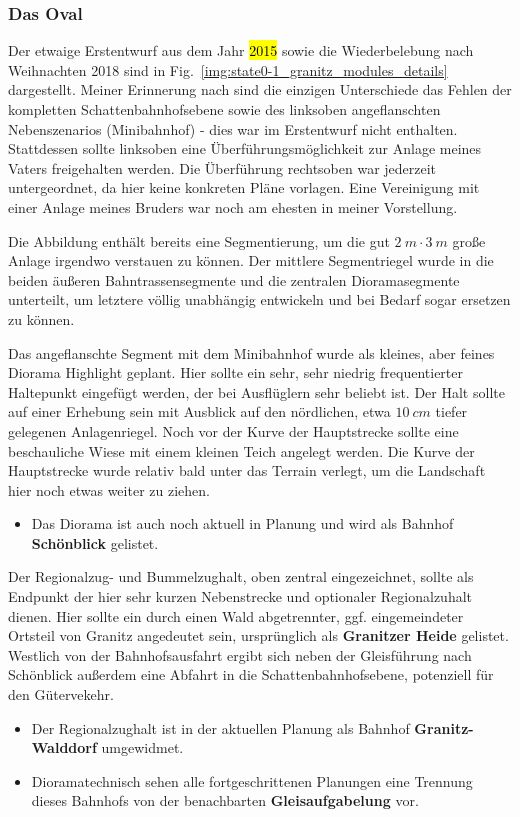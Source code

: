 \subsubsection{Das Oval}
\label{sec:map_development_state1}

Der etwaige Erstentwurf aus dem Jahr \hl{2015} sowie die Wiederbelebung nach Weihnachten 2018 sind in Fig.~\ref{img:state0-1_granitz_modules_details} dargestellt.
Meiner Erinnerung nach sind die einzigen Unterschiede das Fehlen der kompletten Schattenbahnhofsebene sowie des linksoben angeflanschten Nebenszenarios (Minibahnhof) - dies war im Erstentwurf nicht enthalten.
Stattdessen sollte linksoben eine \"Uberf\"uhrungsm\"oglichkeit zur Anlage meines Vaters freigehalten werden.
Die \"Uberf\"uhrung rechtsoben war jederzeit untergeordnet, da hier keine konkreten Pl\"ane vorlagen.
Eine Vereinigung mit einer Anlage meines Bruders war noch am ehesten in meiner Vorstellung.

Die Abbildung enth\"alt bereits eine Segmentierung, um die gut $2~m \cdot 3~m$ gro{\ss}e Anlage irgendwo verstauen zu k\"onnen.
Der mittlere Segmentriegel wurde in die beiden \"au{\ss}eren Bahntrassensegmente und die zentralen Dioramasegmente unterteilt, um letztere v\"ollig unabh\"angig entwickeln und bei Bedarf sogar ersetzen zu k\"onnen.

Das angeflanschte Segment mit dem Minibahnhof wurde als kleines, aber feines Diorama Highlight geplant.
Hier sollte ein sehr, sehr niedrig frequentierter Haltepunkt eingef\"ugt werden, der bei Ausfl\"uglern sehr beliebt ist.
Der Halt sollte auf einer Erhebung sein mit Ausblick auf den n\"ordlichen, etwa $10~cm$ tiefer gelegenen Anlagenriegel.
Noch vor der Kurve der Hauptstrecke sollte eine beschauliche Wiese mit einem kleinen Teich angelegt werden.
Die Kurve der Hauptstrecke wurde relativ bald unter das Terrain verlegt, um die Landschaft hier noch etwas weiter zu ziehen.
\begin{itemize}
	\item Das Diorama ist auch noch aktuell in Planung und wird als Bahnhof \textbf{Sch\"onblick} gelistet.
\end{itemize}

Der Regionalzug- und Bummelzughalt, oben zentral eingezeichnet, sollte als Endpunkt der hier sehr kurzen Nebenstrecke und optionaler Regionalzuhalt dienen.
Hier sollte ein durch einen Wald abgetrennter, ggf. eingemeindeter Ortsteil von Granitz angedeutet sein, urspr\"unglich als \textbf{Granitzer Heide} gelistet.
Westlich von der Bahnhofsausfahrt ergibt sich neben der Gleisf\"uhrung nach Sch\"onblick au{\ss}erdem eine Abfahrt in die Schattenbahnhofsebene, potenziell f\"ur den G\"utervekehr.
\begin{itemize}
	\item Der Regionalzughalt ist in der aktuellen Planung als Bahnhof \textbf{Granitz-Walddorf} umgewidmet.
	\item Dioramatechnisch sehen alle fortgeschrittenen Planungen eine Trennung dieses Bahnhofs von der benachbarten \textbf{Gleisaufgabelung} vor.
\end{itemize}

